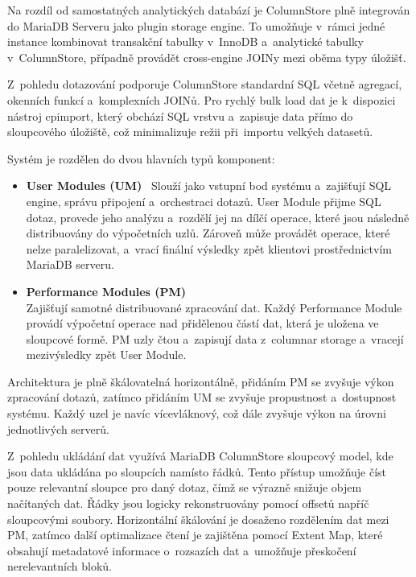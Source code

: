 Na rozdíl od samostatných analytických databází je ColumnStore plně integrován do MariaDB Serveru jako plugin storage engine. 
To umožňuje v~rámci jedné instance kombinovat transakční tabulky v~InnoDB a~analytické tabulky v~ColumnStore, případně provádět cross-engine JOINy mezi oběma typy úložišť.
\cite{mariadbcolumnstore}

Z~pohledu dotazování podporuje ColumnStore standardní SQL včetně agregací, okenních funkcí a~komplexních JOINů. 
Pro rychlý bulk load dat je k~dispozici nástroj cpimport, který obchází SQL vrstvu a~zapisuje data přímo do sloupcového úložiště, což minimalizuje režii při~importu velkých datasetů. 
\cite{mariadbcolumnstore}

Systém je rozdělen do dvou hlavních typů komponent:

\begin{itemize}
\item \textbf{User Modules (UM)} \
Slouží jako vstupní bod systému a~zajišťují SQL engine, správu připojení a~orchestraci dotazů. 
User Module přijme SQL dotaz, provede jeho analýzu a~rozdělí jej na dílčí operace, které jsou následně distribuovány do výpočetních uzlů. 
Zároveň může provádět operace, které nelze paralelizovat, a~vrací finální výsledky zpět klientovi prostřednictvím MariaDB serveru.

\item \textbf{Performance Modules (PM)} \\
Zajišťují samotné distribuované zpracování dat. 
Každý Performance Module provádí výpočetní operace nad přidělenou částí dat, která je uložena ve sloupcové formě. 
PM uzly čtou a~zapisují data z~columnar storage a~vracejí mezivýsledky zpět User Module.

\end{itemize}

Architektura je plně škálovatelná horizontálně, přidáním PM se zvyšuje výkon zpracování dotazů, zatímco přidáním UM se zvyšuje propustnost a~dostupnost systému. 
Každý uzel je navíc vícevláknový, což dále zvyšuje výkon na úrovni jednotlivých serverů.

Z~pohledu ukládání dat využívá MariaDB ColumnStore sloupcový model, kde jsou data ukládána po sloupcích namísto řádků. 
Tento přístup umožňuje číst pouze relevantní sloupce pro daný dotaz, čímž se výrazně snižuje objem načítaných dat. 
Řádky jsou logicky rekonstruovány pomocí offsetů napříč sloupcovými soubory. 
Horizontální škálování je dosaženo rozdělením dat mezi PM, zatímco další optimalizace čtení je zajištěna pomocí Extent Map, které obsahují metadatové informace o~rozsazích dat a~umožňuje přeskočení nerelevantních bloků.

